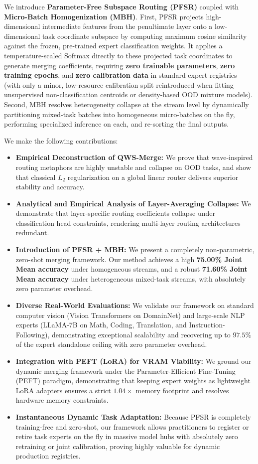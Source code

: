 We introduce \textbf{Parameter-Free Subspace Routing (PFSR)} coupled with \textbf{Micro-Batch Homogenization (MBH)}. First, PFSR projects high-dimensional intermediate features from the penultimate layer onto a low-dimensional task coordinate subspace by computing maximum cosine similarity against the frozen, pre-trained expert classification weights. It applies a temperature-scaled Softmax directly to these projected task coordinates to generate merging coefficients, requiring \textbf{zero trainable parameters}, \textbf{zero training epochs}, and \textbf{zero calibration data} in standard expert registries (with only a minor, low-resource calibration split reintroduced when fitting unsupervised non-classification centroids or density-based OOD mixture models). Second, MBH resolves heterogeneity collapse at the stream level by dynamically partitioning mixed-task batches into homogeneous micro-batches on the fly, performing specialized inference on each, and re-sorting the final outputs. 

We make the following contributions:
\begin{itemize}
    \item \textbf{Empirical Deconstruction of QWS-Merge:} We prove that wave-inspired routing metaphors are highly unstable and collapse on OOD tasks, and show that classical $L_2$ regularization on a global linear router delivers superior stability and accuracy.
    \item \textbf{Analytical and Empirical Analysis of Layer-Averaging Collapse:} We demonstrate that layer-specific routing coefficients collapse under classification head constraints, rendering multi-layer routing architectures redundant.
    \item \textbf{Introduction of PFSR + MBH:} We present a completely non-parametric, zero-shot merging framework. Our method achieves a high \textbf{75.00\% Joint Mean accuracy} under homogeneous streams, and a robust \textbf{71.60\% Joint Mean accuracy} under heterogeneous mixed-task streams, with absolutely zero parameter overhead.
    \item \textbf{Diverse Real-World Evaluations:} We validate our framework on standard computer vision (Vision Transformers on DomainNet) and large-scale NLP experts (LLaMA-7B on Math, Coding, Translation, and Instruction-Following), demonstrating exceptional scalability and recovering up to $97.5\%$ of the expert standalone ceiling with zero parameter overhead.
    \item \textbf{Integration with PEFT (LoRA) for VRAM Viability:} We ground our dynamic merging framework under the Parameter-Efficient Fine-Tuning (PEFT) paradigm, demonstrating that keeping expert weights as lightweight LoRA adapters ensures a strict $1.04\times$ memory footprint and resolves hardware memory constraints.
    \item \textbf{Instantaneous Dynamic Task Adaptation:} Because PFSR is completely training-free and zero-shot, our framework allows practitioners to register or retire task experts on the fly in massive model hubs with absolutely zero retraining or joint calibration, proving highly valuable for dynamic production registries.
\end{itemize}
